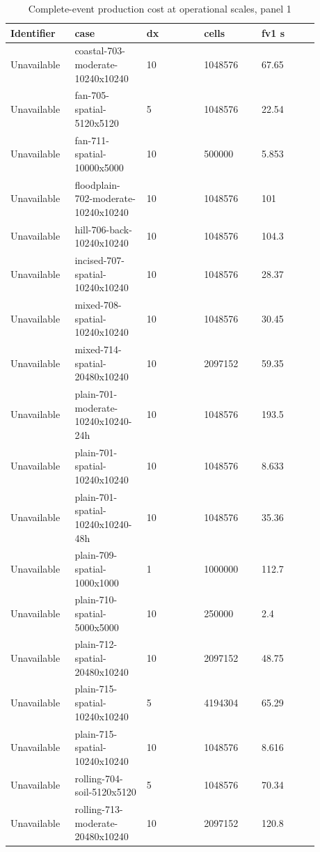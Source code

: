 \begingroup
\small
\setlength{\tabcolsep}{2pt}
\begin{longtable}{p{0.1760\linewidth}p{0.1760\linewidth}p{0.1760\linewidth}p{0.1760\linewidth}p{0.1760\linewidth}}
\caption{Complete-event production cost at operational scales, panel 1}\\
\hline
Identifier & case & dx & cells & fv1 s \\
\hline\endhead
Unavailable & coastal-703-moderate-10240x10240 & 10 & 1048576 & 67.65 \\
Unavailable & fan-705-spatial-5120x5120 & 5 & 1048576 & 22.54 \\
Unavailable & fan-711-spatial-10000x5000 & 10 & 500000 & 5.853 \\
Unavailable & floodplain-702-moderate-10240x10240 & 10 & 1048576 & 101 \\
Unavailable & hill-706-back-10240x10240 & 10 & 1048576 & 104.3 \\
Unavailable & incised-707-spatial-10240x10240 & 10 & 1048576 & 28.37 \\
Unavailable & mixed-708-spatial-10240x10240 & 10 & 1048576 & 30.45 \\
Unavailable & mixed-714-spatial-20480x10240 & 10 & 2097152 & 59.35 \\
Unavailable & plain-701-moderate-10240x10240-24h & 10 & 1048576 & 193.5 \\
Unavailable & plain-701-spatial-10240x10240 & 10 & 1048576 & 8.633 \\
Unavailable & plain-701-spatial-10240x10240-48h & 10 & 1048576 & 35.36 \\
Unavailable & plain-709-spatial-1000x1000 & 1 & 1000000 & 112.7 \\
Unavailable & plain-710-spatial-5000x5000 & 10 & 250000 & 2.4 \\
Unavailable & plain-712-spatial-20480x10240 & 10 & 2097152 & 48.75 \\
Unavailable & plain-715-spatial-10240x10240 & 5 & 4194304 & 65.29 \\
Unavailable & plain-715-spatial-10240x10240 & 10 & 1048576 & 8.616 \\
Unavailable & rolling-704-soil-5120x5120 & 5 & 1048576 & 70.34 \\
Unavailable & rolling-713-moderate-20480x10240 & 10 & 2097152 & 120.8 \\
\end{longtable}

